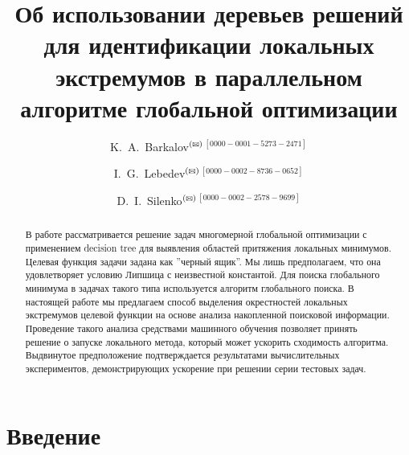 \documentclass{svproc}
\def\orcidID#1{\unskip$^{[#1]}$}
\def\letter{$^{\textrm{(\Letter)}}$}
\begin{document}
\mainmatter              %
%
\title{Об использовании деревьев решений для идентификации локальных экстремумов в параллельном алгоритме глобальной оптимизации}
%
%
\author{K.~A.~Barkalov\letter\orcidID{0000-0001-5273-2471} \and I.~G.~Lebedev\letter\orcidID{0000-0002-8736-0652} \and D.~I.~Silenko\letter\orcidID{0000-0002-2578-9699}}
%
%
%

\maketitle              %

\begin{abstract}
В работе рассматривается решение задач многомерной глобальной оптимизации с применением decision tree для выявления областей притяжения локальных минимумов. Целевая функция задачи задана как ''черный ящик''. 
Мы лишь предполагаем, что она удовлетворяет условию Липшица с неизвестной константой. 
Для поиска глобального минимума в задачах такого типа используется алгоритм глобального поиска.
В настоящей работе мы предлагаем способ выделения окрестностей локальных экстремумов целевой функции на основе анализа накопленной поисковой информации.
Проведение такого анализа средствами машинного обучения позволяет принять решение о запуске локального метода, который может ускорить сходимость алгоритма. Выдвинутое предположение подтверждается результатами вычислительных экспериментов, демонстрирующих ускорение при решении серии тестовых задач. 
\end{abstract}
%

\section{Введение}
\end{document}
